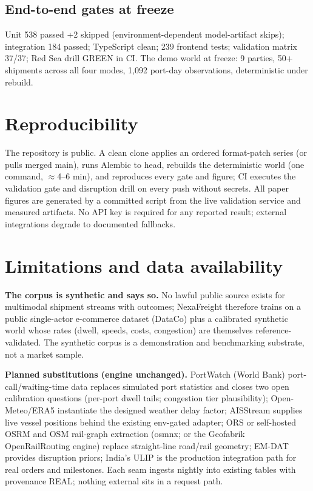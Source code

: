 \documentclass[11pt]{article}
\begin{document}
\subsection{End-to-end gates at freeze}

Unit 538 passed +2 skipped (environment-dependent model-artifact
skips); integration 184 passed; TypeScript clean; 239 frontend tests;
validation matrix 37/37; Red Sea drill GREEN in CI. The demo world at
freeze: 9 parties, 50+ shipments across all four modes, 1{,}092 port-day
observations, deterministic under rebuild.

\section{Reproducibility}

The repository is public. A clean clone applies an ordered
format-patch series (or pulls merged main), runs Alembic to head,
rebuilds the deterministic world (one command, $\approx$4--6 min), and
reproduces every gate and figure; CI executes the validation gate and
disruption drill on every push without secrets. All paper figures are
generated by a committed script from the live validation service and
measured artifacts. No API key is required for any reported result;
external integrations degrade to documented fallbacks.

\section{Limitations and data availability}

\textbf{The corpus is synthetic and says so.} No lawful public source
exists for multimodal shipment streams with outcomes; NexaFreight
therefore trains on a public single-actor e-commerce dataset (DataCo)
plus a calibrated synthetic world whose rates (dwell, speeds, costs,
congestion) are themselves reference-validated. The synthetic corpus is
a demonstration and benchmarking substrate, not a market sample.

\textbf{Planned substitutions (engine unchanged).} PortWatch (World
Bank) port-call/waiting-time data replaces simulated port statistics and
closes two open calibration questions (per-port dwell tails; congestion
tier plausibility); Open-Meteo/ERA5 instantiate the designed weather
delay factor; AISStream supplies live vessel positions behind the
existing env-gated adapter; ORS or self-hosted OSRM and OSM rail-graph
extraction (osmnx; or the Geofabrik OpenRailRouting engine) replace
straight-line road/rail geometry; EM-DAT provides disruption priors;
India's ULIP is the production integration path for real orders and
milestones. Each seam ingests nightly into existing tables with
provenance REAL; nothing external sits in a request path.
\end{document}
